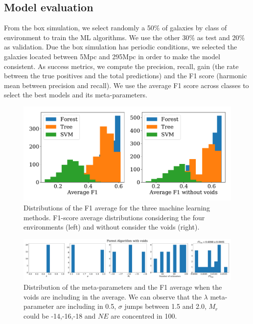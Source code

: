 \documentclass[usenatbib]{mnras}
\begin{document}
\subsection{Model evaluation}

From the box simulation, we select randomly a 50$\%$ of galaxies by class of environment to train the ML algorithms. We use the other 30$\%$ as test and  20$\%$ as validation. Due the box simulation has periodic conditions, we selected the galaxies located between 5Mpc and 295Mpc in order to make the model consistent.  
As success metrics, we compute the precision, recall, gain (the rate between the true positives
and the total predictions) and the F1 score (harmonic mean between precision and recall).
We use the average F1 score across classes to select the best models and its meta-parameters.

\begin{figure}
    \includegraphics[scale=0.45]{Figs/p_hist_f1.pdf}
    \caption{Distributions of the F1 average for the three machine learning methods. F1-score average distributions considering the four environments (left) and without consider the voids (right).}
    \label{fig:methods}
\end{figure}

\begin{figure}
\centering
    \includegraphics[scale=0.22]{Figs/p_features_Forest_F1_av.pdf}
    \caption{Distribution of the meta-parameters and the F1 average when the voids are including in the average. We can observe that the $\lambda$ meta-parameter are including in 0.5, $\sigma$ jumps between 1.5 and 2.0, $M_r$ could be -14,-16,-18 and $NE$ are concentred in 100.}
    \label{fig:features_no_void}    
\end{figure}
\end{document}
